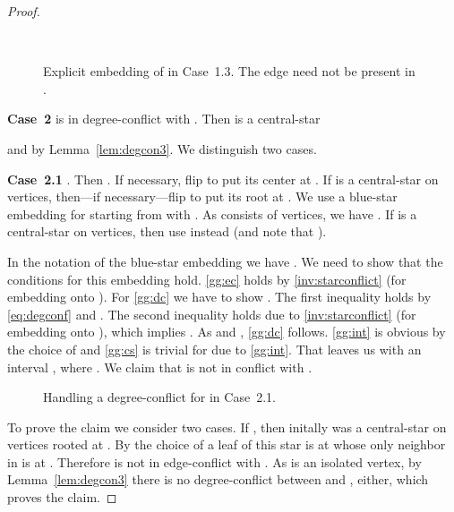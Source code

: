 \documentclass[11pt,a4paper,colorlinks=true,urlcolor=blue,citecolor=red]{article}
\theoremstyle{plain}
\newcommand{\case}[1]{\par\vspace{.5\baselineskip}\noindent\textbf{\sffamily Case~#1}}
\begin{document}
\begin{proof}
  \begin{figure}[thbp]
    \centering {}\hfil {}\hfil {}\\
    \hfil {}\hfil {}
    \caption{Explicit embedding of  in Case~1.3. The edge
       need not be present in
      .\label{fig:general_inline2}}
  \end{figure}

  \case{2}  is in degree-conflict with . Then
   is a central-star 

and  by Lemma~\ref{lem:degcon3}. We distinguish
  two cases.

  \case{2.1} . Then . If
  necessary, flip  to put its center at . If 
  is a central-star on  vertices, then---if necessary---flip
   to put its root at . We use a blue-star embedding
  for  starting from  with . As
   consists of  vertices, we have
  . If
   is a central-star on  vertices, then
  use  instead (and note that
  ).

  In the notation of the blue-star embedding we have
  . We need to show that the conditions for this
  embedding hold. \ref{gg:ec} holds by \ref{inv:starconflict} (for
  embedding  onto ). For \ref{gg:dc} we have to show
  . The first inequality holds by
  \eqref{eq:degconf} and . The second inequality holds due
  to \ref{inv:starconflict} (for embedding  onto ), which
  implies . As  and
  , \ref{gg:dc} follows. \ref{gg:int} is
  obvious by the choice of  and \ref{gg:cs} is trivial for
   due to \ref{gg:int}. That leaves us with an interval , where .  We
  claim that  is not in conflict with .

\begin{figure}[htbp]
    \centering\hfil {}\hfil
    \hfil
    \hfil
    \caption{Handling a degree-conflict for  in
      Case~2.1.\label{fig:modgreedygrab}}
  \end{figure}


  To prove the claim we consider two cases. If , then initally
   was a central-star on  vertices rooted
  at . By the choice of  a leaf of this star is at 
  whose only neighbor in  is at . Therefore  is
  not in edge-conflict with .  As  is an
  isolated vertex, by Lemma~\ref{lem:degcon3} there is no
  degree-conflict between  and , either, which proves the
  claim.


\end{proof}
\end{document}
